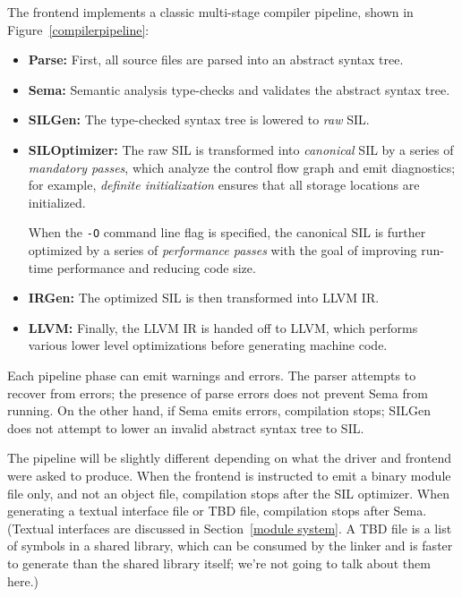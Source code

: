 \documentclass[a4paper,headsepline,bibliography=totoc,toc=flat,fleqn,twoside=semi]{scrbook}
\theoremstyle{definition}
\theoremstyle{definition}
\theoremstyle{definition}
\begin{document}
\medskip
{}
The frontend implements a classic multi-stage compiler pipeline, shown in Figure~\ref{compilerpipeline}:
\begin{itemize}
\item \textbf{Parse:} First, all source files are parsed into an abstract syntax tree.
\item \textbf{Sema:} Semantic analysis type-checks and validates the abstract syntax tree.
\item \textbf{SILGen:} The type-checked syntax tree is lowered to \emph{raw} SIL.
\item \textbf{SILOptimizer:} The raw SIL is transformed into \emph{canonical} SIL by a series of \emph{mandatory passes}, which analyze the control flow graph and emit diagnostics; for example, \emph{definite initialization} ensures that all storage locations are initialized.

When the \texttt{-O} command line flag is specified, the canonical SIL is further optimized by a series of \emph{performance passes} with the goal of improving run-time performance and reducing code size.
\item \textbf{IRGen:} The optimized SIL is then transformed into LLVM IR.
\item \textbf{LLVM:} Finally, the LLVM IR is handed off to LLVM, which performs various lower level optimizations before generating machine code.
\end{itemize}
Each pipeline phase can emit warnings and errors. The parser attempts to recover from errors; the presence of parse errors does not prevent Sema from running. On the other hand, if Sema emits errors, compilation stops; SILGen does not attempt to lower an invalid abstract syntax tree to SIL.

The pipeline will be slightly different depending on what the driver and frontend were asked to produce. When the frontend is instructed to emit a binary module file only, and not an object file, compilation stops after the SIL optimizer. When generating a textual interface file or TBD file, compilation stops after Sema. (Textual interfaces are discussed in Section~\ref{module system}. A TBD file is a list of symbols in a shared library, which can be consumed by the linker and is faster to generate than the shared library itself; we're not going to talk about them here.)
\end{document}
